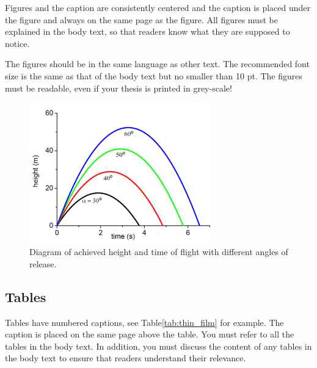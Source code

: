 Figures and the caption are consistently centered  and the caption is 
placed under the figure and always on the same page as the figure. 
All figures must be explained in the body text, so that readers know 
what they are supposed to notice. 

The figures should be in the same language as other text. The recommended 
font size is the same as that of the body text but no smaller than 10 pt. 
The figures must be readable, even if your thesis is printed in grey-scale!


\begin{figure}[t]
  \begin{center}
    \includegraphics[width=0.7\textwidth]{figure}
  \end{center}
  \caption{Diagram of achieved height and time of flight with different angles of release.}
  \label{fig:ex_fig}
\end{figure}


\subsection{Tables}

Tables have numbered captions, see Table\ref{tab:thin_film} for
example. The caption is placed on the same page above the table. You 
must refer to all the tables in the body text. In addition, you must 
discuss the content of any tables in the body text to ensure that readers 
understand their relevance.

